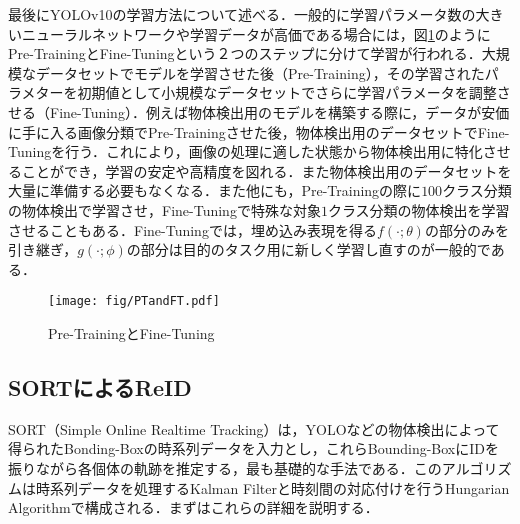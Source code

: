     最後にYOLOv10の学習方法について述べる．一般的に学習パラメータ数の大きいニューラルネットワークや学習データが高価である場合には，図\ref{fig:PTandFT}のようにPre-TrainingとFine-Tuningという２つのステップに分けて学習が行われる．大規模なデータセットでモデルを学習させた後（Pre-Training），その学習されたパラメターを初期値として小規模なデータセットでさらに学習パラメータを調整させる（Fine-Tuning）\cite{radford2018improving}．例えば物体検出用のモデルを構築する際に，データが安価に手に入る画像分類でPre-Trainingさせた後，物体検出用のデータセットでFine-Tuningを行う．これにより，画像の処理に適した状態から物体検出用に特化させることができ，学習の安定や高精度を図れる．また物体検出用のデータセットを大量に準備する必要もなくなる．また他にも，Pre-Trainingの際に$100$クラス分類の物体検出で学習させ，Fine-Tuningで特殊な対象$1$クラス分類の物体検出を学習させることもある．Fine-Tuningでは，埋め込み表現を得る$f(\cdot ; \theta)$の部分のみを引き継ぎ，$g(\cdot; \phi)$の部分は目的のタスク用に新しく学習し直すのが一般的である．

    \begin{figure}[t]
        \centering    
        \texttt{[image: fig/PTandFT.pdf]}
        \caption[Pre-TrainingとFine-Tuning]{Pre-TrainingとFine-Tuning}
        \label{fig:PTandFT}
    \end{figure}
    
    \subsection{SORTによるReID}
    SORT（Simple Online Realtime Tracking）は，YOLOなどの物体検出によって得られたBonding-Boxの時系列データを入力とし，これらBounding-BoxにIDを振りながら各個体の軌跡を推定する，最も基礎的な手法である．このアルゴリズムは時系列データを処理するKalman Filterと時刻間の対応付けを行うHungarian Algorithmで構成される．まずはこれらの詳細を説明する．

